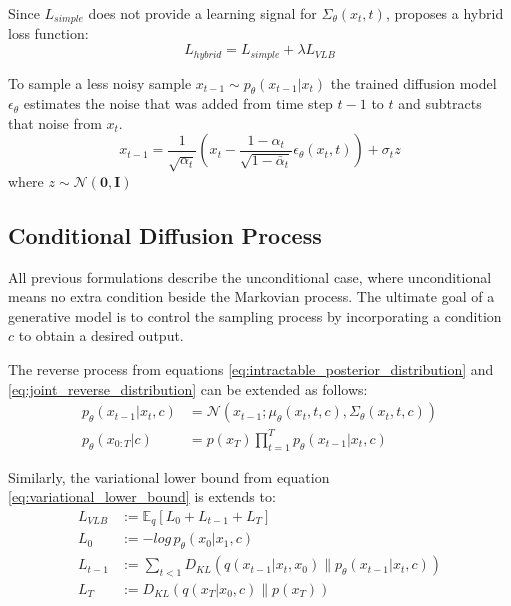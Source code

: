 Since $L_{simple}$ does not provide a learning signal for $\Sigma_{\theta}\left(x_t,t\right)$, \cite{nichol_improved_2021} proposes a hybrid loss function:
\begin{equation}
L_{hybrid} = L_{simple} + \lambda L_{VLB}
\end{equation}

To sample a less noisy sample $x_{t-1}\sim p_{\theta}\left(x_{t-1}|x_t\right)$ the trained diffusion model $\epsilon_{\theta}$ estimates the noise that was added from time step $t-1$ to $t$ and subtracts that noise from $x_t$.
\begin{equation}
x_{t-1} = \frac{1}{\sqrt{\alpha_t}}\left(x_t - \frac{1-\alpha_t}{\sqrt{1-\bar{\alpha}_t}}\epsilon_{\theta}(x_t,t)\right) + \sigma_t z
\end{equation}
where $ z \sim \mathcal{N}\left(\boldsymbol{0},\boldsymbol{I}\right) $

\subsection{Conditional Diffusion Process} \label{sec:conditional_diffusion_process}
All previous formulations describe the unconditional case, where unconditional means no extra condition beside the Markovian process. The ultimate goal of a generative model is to control the sampling process by incorporating a condition $c$ to obtain a desired output.

The reverse process from equations \eqref{eq:intractable_posterior_distribution} and \eqref{eq:joint_reverse_distribution} can be extended as follows:
\begin{equation}
\begin{aligned}
p_{\theta}\left(x_{t-1}|x_t, c\right) & = \mathcal{N}\left(x_{t-1};\mu_{\theta}\left(x_t,t,c\right),\Sigma_{\theta}\left(x_t,t,c\right)\right) \\
p_{\theta}\left(x_{0:T}|c\right) & = p\left(x_{T}\right)\prod_{t=1}^{T} p_{\theta}\left(x_{t-1}|x_{t},c\right)
\end{aligned}
\end{equation}

Similarly, the variational lower bound from equation \eqref{eq:variational_lower_bound} is extends to:
\begin{equation}
\label{eq:variational_lower_bound_conditional}
\begin{aligned}
L_{VLB} & := \mathbb{E}_{q}\left[L_{0} + L_{t-1} + L_{T}\right] \\
L_{0} & := -log\, p_{\theta}\left(x_{0}|x_{1},c\right)\\
L_{t-1} & := \sum_{t<1}D_{KL}\left(q\left(x_{t-1}|x_t,x_0\right)\|p_{\theta}\left(x_{t-1}|x_t,c\right)\right)\\
L_{T} & := D_{KL}\left(q\left(x_{T}|x_0,c\right)\|p\left(x_{T}\right)\right)
\end{aligned}
\end{equation}